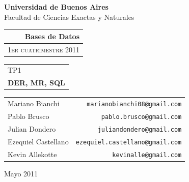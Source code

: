 \documentclass[12pt,titlepage]{article}
\begin{document}
\begin{titlepage}
\begin{center}
{\textbf{Universidad de Buenos Aires}\\Facultad de Ciencias Exactas y Naturales}

\vspace{1.5cm}

\begin{tabular}{r}
{\Large \bfseries Bases de Datos}\\
\hline
\textsc{\small 1er cuatrimestre 2011}\\
\end{tabular}
\vspace{2cm}

\begin{tabular}{l}
{\large TP1}\\
\textbf{\Huge DER, MR, SQL}\\
\end{tabular}

\vspace{1cm}


\vspace{1cm}

\begin{tabular}{lr}
Mariano Bianchi & \texttt{marianobianchi08@gmail.com}\\
Pablo Brusco & \texttt{pablo.brusco@gmail.com}\\
Julian Dondero & \texttt{juliandondero@gmail.com}\\
Ezequiel Castellano & \texttt{ezequiel.castellano@gmail.com}\\
Kevin Allekotte & \texttt{kevinalle@gmail.com}\\
\end{tabular}

\vspace{2cm}

{\large Mayo 2011}

\end{center}
\end{titlepage}
\protect\setcounter{tocdepth}{1}
\end{document}
